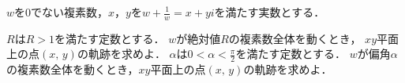 \documentclass[../../main.tex]{subfiles}
\begin{document}
$w$を0でない複素数，$x$，$y$を$\displaystyle w+\frac{1}{w}=x+yi$を満たす実数とする．
\begin{enumerate}
  $R$は$R>1$を満たす定数とする．
    $w$が絶対値$R$の複素数全体を動くとき，
    $xy$平面上の点$(x, \, y)$の軌跡を求めよ．
  $\alpha$は$\displaystyle0<\alpha<\frac{\pi}{2}$を満たす定数とする．
    $w$が偏角$\alpha$の複素数全体を動くとき，$xy$平面上の点$(x, \, y)$の軌跡を求めよ．
\end{enumerate}
\end{document}
